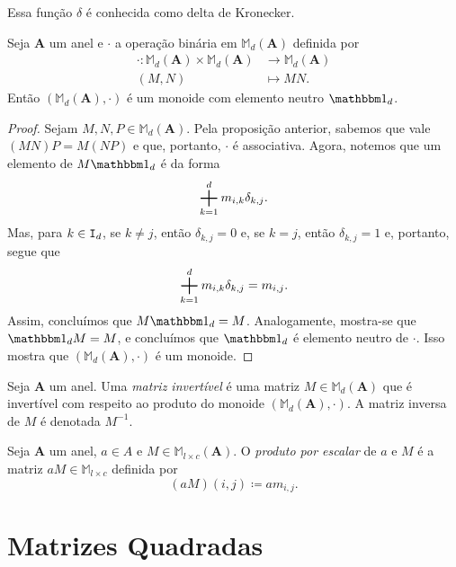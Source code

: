 Essa função $\delta$ é conhecida como delta de Kronecker.

\begin{prop}
	Seja $\bm A$ um anel e $\cdot$ a operação binária em $\mathbb M_d(\bm A)$ definida por
	\begin{align*}
	\cdot: \mathbb M_d(\bm A) \times \mathbb M_d(\bm A) &\to \mathbb M_d(\bm A) \\
	(M,N) &\mapsto MN.
	\end{align*}
Então $(\mathbb M_d(\bm A),\cdot)$ é um monoide com elemento neutro $\id_d$.
\end{prop}
\begin{proof}
	Sejam $M,N,P \in \mathbb M_d(\bm A)$. Pela proposição anterior, sabemos que vale $(MN)P=M(NP)$ e que, portanto, $\cdot$ é associativa. Agora, notemos que um elemento de $M\id_d$ é da forma
	\begin{equation*}
	\bigsum_{k=1}^d m_{i,k}\delta_{k,j}.
	\end{equation*}
Mas, para $k \in \mathtt I_d$, se $k \neq j$, então $\delta_{k,j}=0$ e, se $k=j$, então $\delta_{k,j}=1$ e, portanto, segue que
	\begin{equation*}
	\bigsum_{k=1}^d m_{i,k}\delta_{k,j} = m_{i,j}.
	\end{equation*}
Assim, concluímos que $M\id_d=M$. Analogamente, mostra-se que $\id_dM=M$, e concluímos que $\id_d$ é elemento neutro de $\cdot$. Isso mostra que $(\mathbb M_d(\bm A),\cdot)$ é um monoide.
\end{proof}

\begin{defi}
	Seja $\bm A$ um anel. Uma \emph{matriz invertível} é uma matriz $M \in \mathbb M_d(\bm A)$ que é invertível com respeito ao produto do monoide $(\mathbb M_d(\bm A),\cdot)$. A matriz inversa de $M$ é denotada $M^{-1}$.
\end{defi}

\begin{defi}
	Seja $\bm A$ um anel, $a \in A$ e $M \in \mathbb M_{l \times c}(\bm A)$. O \emph{produto por escalar} de $a$ e $M$ é a matriz $aM \in \mathbb M_{l \times c}$ definida por
	\begin{equation*}
	(aM)(i,j) \coloneqq am_{i,j}.
	\end{equation*}
\end{defi}

\section{Matrizes Quadradas}

